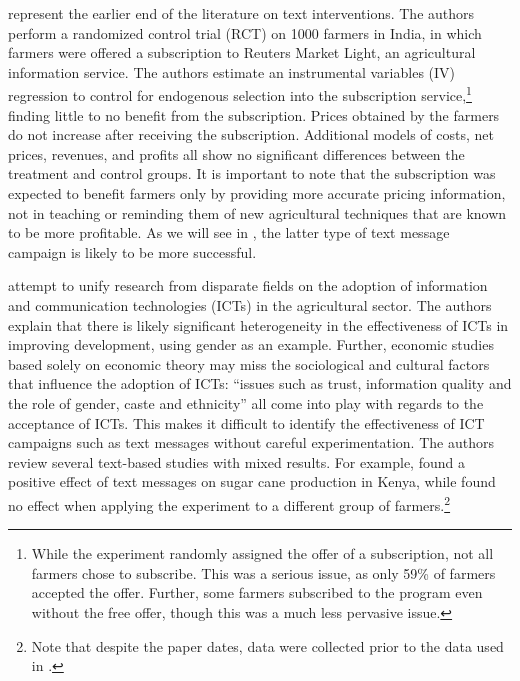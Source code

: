 \documentclass[12pt]{article}
\begin{document}
\textcite{fafchamps_impact_2012} represent the earlier end of the literature on text interventions. The authors perform a randomized control trial (RCT) on 1000 farmers in India, in which farmers were offered a subscription to Reuters Market Light, an agricultural information service. The authors estimate an instrumental variables (IV) regression to control for endogenous selection into the subscription service,\footnote{While the experiment randomly assigned the offer of a subscription, not all farmers chose to subscribe. This was a serious issue, as only 59\% of farmers accepted the offer. Further, some farmers subscribed to the program even without the free offer, though this was a much less pervasive issue.} finding little to no benefit from the subscription. Prices obtained by the farmers do not increase after receiving the subscription. Additional models of costs, net prices, revenues, and profits all show no significant differences between the treatment and control groups. It is important to note that the subscription was expected to benefit farmers only by providing more accurate pricing information, not in teaching or reminding them of new agricultural techniques that are known to be more profitable. As we will see in \textcite{fabregas_digital_2025}, the latter type of text message campaign is likely to be more successful.

\textcite{aker_promise_2016} attempt to unify research from disparate fields on the adoption of information and communication technologies (ICTs) in the agricultural sector. The authors explain that there is likely significant heterogeneity in the effectiveness of ICTs in improving development, using gender as an example. Further, economic studies based solely on economic theory may miss the sociological and cultural factors that influence the adoption of ICTs: ``issues such as trust, information quality and the role of gender, caste and ethnicity'' all come into play with regards to the acceptance of ICTs. This makes it difficult to identify the effectiveness of ICT campaigns such as text messages without careful experimentation. The authors review several text-based studies with mixed results. For example, \textcite{casaburi_harnessing_2019} found a positive effect of text messages on sugar cane production in Kenya, while \textcite{casaburi_management_2016} found no effect when applying the experiment to a different group of farmers.\footnote{Note that despite the paper dates, \textcite{casaburi_harnessing_2019} data were collected prior to the data used in \textcite{casaburi_management_2016}.}
\end{document}
